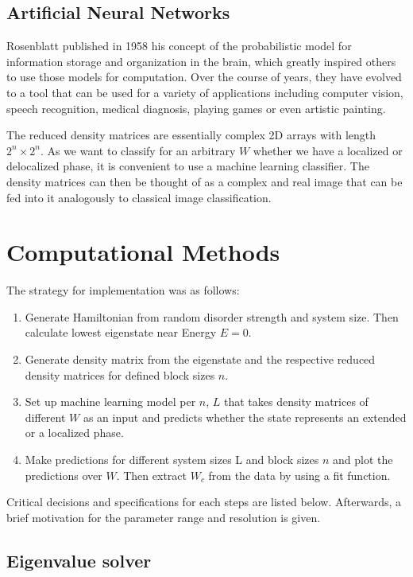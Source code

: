\documentclass[reprint,amsmath,amssymb,aps,prb]{revtex4-2}
\begin{document}
\subsection{Artificial Neural Networks}

Rosenblatt published in 1958 his concept of the probabilistic model for information storage and organization in the brain, which greatly inspired others to use those models for computation.\cite{Rosenblatt1958} Over the course of years, they have evolved to a tool that can be used for a variety of applications including computer vision, speech recognition, medical diagnosis, playing games or even artistic painting.\cite{Gatys2015}

The reduced density matrices are essentially complex 2D arrays with length $2^n\times2^n$. As we want to classify for an arbitrary $W$ whether we have a localized or delocalized phase, it is convenient to use a machine learning classifier. The density matrices can then be thought of as a complex and real image that can be fed into it analogously to classical image classification.%


\section{Computational Methods}

The strategy for implementation was as follows:

\begin{enumerate}
	\item Generate Hamiltonian from random disorder strength and system size. Then calculate lowest eigenstate near Energy $E = 0$.
	\item Generate density matrix from the eigenstate and the respective reduced density matrices for defined block sizes $n$.
	\item  Set up machine learning model per $n$, $L$ that takes density matrices of different $W$ as an input and predicts whether the state represents an extended or a localized phase.
	\item Make predictions for different system sizes L and block sizes $n$ and plot the predictions over $W$. Then extract $W_c$	from the data by using a fit function.
\end{enumerate}

Critical decisions and specifications for each steps are listed below. Afterwards, a brief motivation for the parameter range and resolution is given.

\subsection{Eigenvalue solver}
\end{document}
